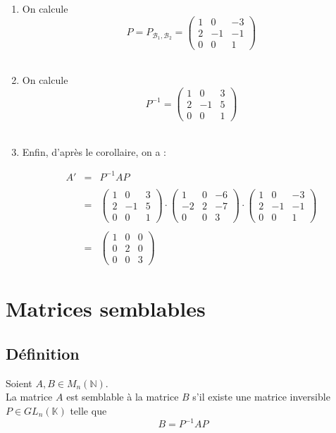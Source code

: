 \documentclass[a4paper,10pt]{book} %
\newcommand{\N}{\mathbb{N}}
\newcommand{\B}{\mathcal{B}}
\begin{document}
\begin{enumerate}
\item On calcule $$P=P_{\B_1,\B_2}=\begin{pmatrix} 1 & 0 & -3 \\ 2 & -1 & -1 \\ 0 & 0 & 1 \end{pmatrix}$$\\

\item On calcule
$$P^{-1}=\begin{pmatrix} 1 & 0 & 3 \\ 2 & -1 & 5 \\ 0 & 0 & 1 \end{pmatrix}$$\\

\item Enfin, d'après le corollaire, on a :

$$\begin{array}{rcl}A'&=& P^{-1}AP \\\\
&=& \begin{pmatrix} 1 & 0 & 3 \\ 2 & -1 & 5 \\ 0 & 0 & 1 \end{pmatrix}\cdot
\begin{pmatrix} 1 & 0 & -6 \\ -2 & 2 & -7 \\ 0 & 0 & 3 \end{pmatrix}\cdot
\begin{pmatrix} 1 & 0 & -3 \\ 2 & -1 & -1 \\ 0 & 0 & 1 \end{pmatrix} \\\\
&=& \begin{pmatrix} 1 & 0 & 0 \\ 0 & 2 & 0 \\ 0 & 0 & 3 \end{pmatrix}\end{array}$$
\end{enumerate}

\newpage

\section{Matrices semblables}
\subsection{Définition}
Soient $A,B\in M_n(\N)$.\\
La matrice $A$ est semblable à la matrice $B$ s'il existe une matrice inversible $P\in GL_n(\mathbb{K})$ telle que $$B=P^{-1}AP$$
\end{document}
